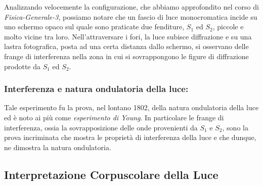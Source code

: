 \begin{center}
\end{center}
\vspace{1em}

	Analizzando velocemente la configurazione, che abbiamo approfondito nel corso di \textit{Fisica-Generale-3}, possiamo notare che un fascio di luce monocromatica incide su uno schermo opaco sul quale sono praticate due fenditure, $S_1$ ed $S_2$, piccole e molto vicine tra loro. Nell’attraversare i fori, la luce subisce diffrazione e su una lastra fotografica, posta ad una certa distanza dallo schermo, si osservano delle frange di interferenza nella zona in cui si sovrappongono le figure di diffrazione prodotte da $S_1$ ed $S_2$.

\subsubsection{Interferenza e natura ondulatoria della luce:}
	
	 Tale esperimento fu la prova, nel lontano 1802, della natura ondulatoria della luce ed è noto ai più come \textit{esperimento di Young}. In particolare le frange di interferenza, ossia la sovrapposizione delle onde provenienti da $S_1$ e $S_2$, sono la prova incriminata che mostra le proprietà di interferenza della luce e che dunque, ne dimostra la natura ondulatoria.
	
\subsection{Interpretazione Corpuscolare della Luce}

